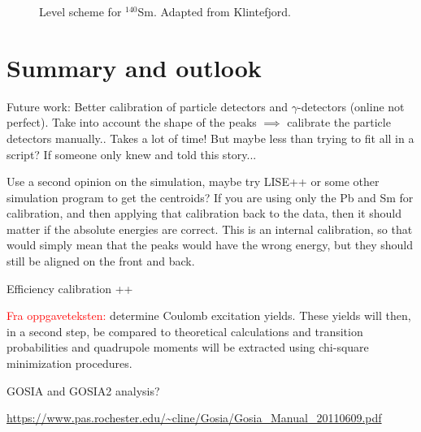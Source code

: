 \documentclass[twoside,english]{uiofysmaster/uiofysmaster}
\newcommand{\Sm}{$^{140}$Sm} %
\newcommand{\ga}{$\gamma$}
\begin{document}
\begin{figure}[ht]
	\centering
	
	\caption{Level scheme for \Sm. Adapted from Klintefjord.}
	\label{fig:levels}
\end{figure}





\chapter{Summary and outlook}

Future work: Better calibration of particle detectors and \ga-detectors (online not perfect). Take into account the shape of the peaks $\implies$ calibrate the particle detectors manually.. Takes a lot of time! But maybe less than trying to fit all in a script? If someone only knew and told this story...

Use a second opinion on the simulation, maybe try LISE++ or some other simulation program to get the centroids?
If you are using only the Pb and Sm for calibration, and then applying that calibration back to the data, then it should matter if the absolute energies are correct. 
This is an internal calibration, so that would simply mean that the peaks would have the wrong energy, but they should still be aligned on the front and back.

\bigskip

Efficiency calibration ++

\bigskip

\textcolor{red}{Fra oppgaveteksten:} \newline
determine Coulomb excitation yields. These yields will then, in a second step, be compared to theoretical calculations and transition probabilities and quadrupole moments will be extracted using chi-square minimization procedures.


GOSIA and GOSIA2 analysis?

\url{https://www.pas.rochester.edu/~cline/Gosia/Gosia_Manual_20110609.pdf}

\end{document}
